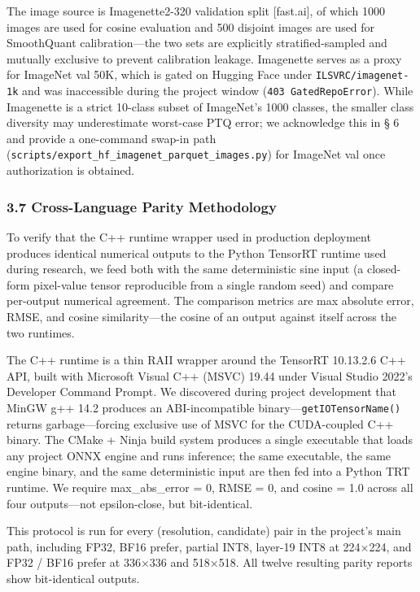 \documentclass[
]{article}
\begin{document}
The image source is Imagenette2-320 validation split {[}fast.ai{]}, of
which 1000 images are used for cosine evaluation and 500 disjoint images
are used for SmoothQuant calibration---the two sets are explicitly
stratified-sampled and mutually exclusive to prevent calibration
leakage. Imagenette serves as a proxy for ImageNet val 50K, which is
gated on Hugging Face under \texttt{ILSVRC/imagenet-1k} and was
inaccessible during the project window (\texttt{403\ GatedRepoError}).
While Imagenette is a strict 10-class subset of ImageNet's 1000 classes,
the smaller class diversity may underestimate worst-case PTQ error; we
acknowledge this in § 6 and provide a one-command swap-in path
(\texttt{scripts/export\_hf\_imagenet\_parquet\_images.py}) for ImageNet
val once authorization is obtained.

\subsubsection{3.7 Cross-Language Parity
Methodology}\label{cross-language-parity-methodology}

To verify that the C++ runtime wrapper used in production deployment
produces identical numerical outputs to the Python TensorRT runtime used
during research, we feed both with the same deterministic sine input (a
closed-form pixel-value tensor reproducible from a single random seed)
and compare per-output numerical agreement. The comparison metrics are
max absolute error, RMSE, and cosine similarity---the cosine of an
output against itself across the two runtimes.

The C++ runtime is a thin RAII wrapper around the TensorRT 10.13.2.6 C++
API, built with Microsoft Visual C++ (MSVC) 19.44 under Visual Studio
2022's Developer Command Prompt. We discovered during project
development that MinGW g++ 14.2 produces an ABI-incompatible
binary---\texttt{getIOTensorName()} returns garbage---forcing exclusive
use of MSVC for the CUDA-coupled C++ binary. The CMake + Ninja build
system produces a single executable that loads any project ONNX engine
and runs inference; the same executable, the same engine binary, and the
same deterministic input are then fed into a Python TRT runtime. We
require max\_abs\_error = 0, RMSE = 0, and cosine = 1.0 across all four
outputs---not epsilon-close, but bit-identical.

This protocol is run for every (resolution, candidate) pair in the
project's main path, including FP32, BF16 prefer, partial INT8, layer-19
INT8 at 224×224, and FP32 / BF16 prefer at 336×336 and 518×518. All
twelve resulting parity reports show bit-identical outputs.
\end{document}
